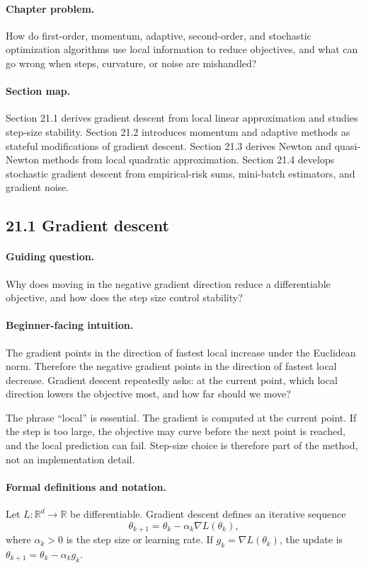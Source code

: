 \paragraph{Chapter problem.}
How do first-order, momentum, adaptive, second-order, and stochastic optimization algorithms use local information to reduce objectives, and what can go wrong when steps, curvature, or noise are mishandled?

\paragraph{Section map.}
Section 21.1 derives gradient descent from local linear approximation and studies step-size stability. Section 21.2 introduces momentum and adaptive methods as stateful modifications of gradient descent. Section 21.3 derives Newton and quasi-Newton methods from local quadratic approximation. Section 21.4 develops stochastic gradient descent from empirical-risk sums, mini-batch estimators, and gradient noise.

\subsection{21.1 Gradient descent}

\paragraph{Guiding question.}
Why does moving in the negative gradient direction reduce a differentiable objective, and how does the step size control stability?

\paragraph{Beginner-facing intuition.}
The gradient points in the direction of fastest local increase under the Euclidean norm. Therefore the negative gradient points in the direction of fastest local decrease. Gradient descent repeatedly asks: at the current point, which local direction lowers the objective most, and how far should we move?

The phrase ``local'' is essential. The gradient is computed at the current point. If the step is too large, the objective may curve before the next point is reached, and the local prediction can fail. Step-size choice is therefore part of the method, not an implementation detail.

\paragraph{Formal definitions and notation.}
Let \(L:\mathbb R^d\to\mathbb R\) be differentiable. Gradient descent defines an iterative sequence
\[
\boxed{
\theta_{k+1}=\theta_k-\alpha_k\nabla L(\theta_k),
}
\]
where \(\alpha_k>0\) is the step size or learning rate. If \(g_k=\nabla L(\theta_k)\), the update is \(\theta_{k+1}=\theta_k-\alpha_k g_k\).

